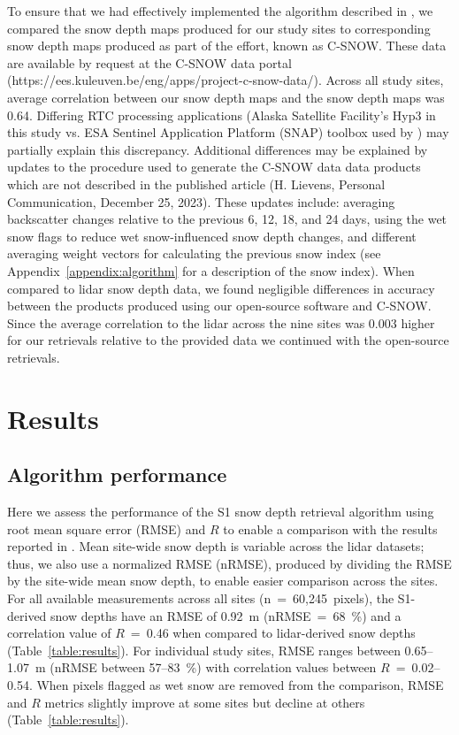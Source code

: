 \documentclass[journal abbreviation, manuscript]{copernicus}
\begin{document}
To ensure that we had effectively implemented the algorithm described in \citet{Lievens.2022}, we compared the snow depth maps produced for our study sites to corresponding snow depth maps produced as part of the \citet{Lievens.2022} effort, known as C-SNOW. These data are available by request at the C-SNOW data portal (https://ees.kuleuven.be/eng/apps/project-c-snow-data/). Across all study sites, average correlation between our snow depth maps and the \citet{Lievens.2022} snow depth maps was 0.64. Differing RTC processing applications (Alaska Satellite Facility's Hyp3 in this study vs. ESA Sentinel Application Platform (SNAP) toolbox used by \citet{Lievens.2022}) may partially explain this discrepancy. Additional differences may be explained by updates to the procedure used to generate the C-SNOW data data products which are not described in the published article (H. Lievens, Personal Communication, December 25, 2023). These updates include: averaging backscatter changes relative to the previous 6, 12, 18, and 24 days, using the wet snow flags to reduce wet snow-influenced snow depth changes, and different averaging weight vectors for calculating the previous snow index (see Appendix~\ref{appendix:algorithm} for a description of the snow index). When compared to lidar snow depth data, we found negligible differences in accuracy between the products produced using our open-source software and C-SNOW. Since the average correlation to the lidar across the nine sites was 0.003 higher for our retrievals relative to the provided data we continued with the open-source retrievals.

\section{Results}

\subsection{Algorithm performance} \label{sec:results.performance}

Here we assess the performance of the S1 snow depth retrieval algorithm using root mean square error (RMSE) and $R$ to enable a comparison with the results reported in \citet{Lievens.2022}. Mean site-wide snow depth is variable across the lidar datasets; thus, we also use a normalized RMSE (nRMSE), produced by dividing the RMSE by the site-wide mean snow depth, to enable easier comparison across the sites. For all available measurements across all sites (n~=~60,245~pixels), the S1-derived snow depths have an RMSE of 0.92~m (nRMSE~=~68~\%) and a correlation value of $R$~=~0.46 when compared to lidar-derived snow depths (Table~\ref{table:results}). For individual study sites, RMSE ranges between 0.65--1.07~m (nRMSE between 57--83~\%) with correlation values between $R$~=~0.02--0.54. When pixels flagged as wet snow are removed from the comparison, RMSE and $R$ metrics slightly improve at some sites but decline at others (Table~\ref{table:results}).
\end{document}
